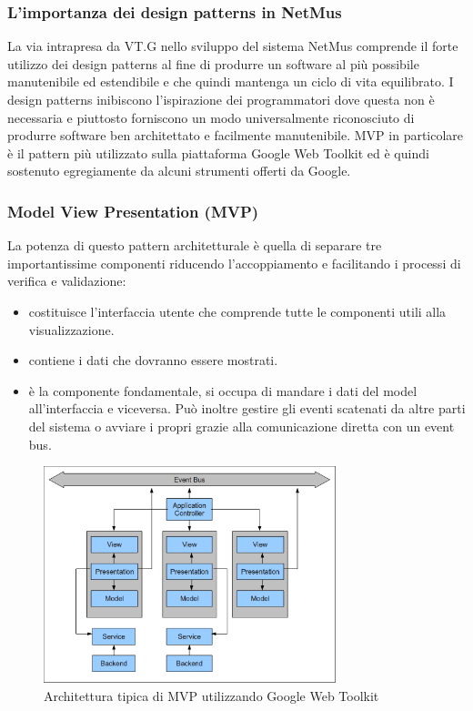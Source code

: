 \subsubsection{L'importanza dei design patterns in NetMus}
La via intrapresa da VT.G nello sviluppo del sistema NetMus comprende il forte
utilizzo dei design patterns al fine di produrre un software al pi\`u
possibile manutenibile ed estendibile e che quindi mantenga un ciclo di
vita equilibrato. 
I design patterns inibiscono l'ispirazione dei programmatori dove
questa non \`e necessaria e piuttosto forniscono un modo universalmente
riconosciuto di produrre software ben architettato e facilmente manutenibile.
MVP in particolare \`e il pattern pi\`u utilizzato sulla piattaforma Google Web
Toolkit ed \`e quindi sostenuto egregiamente da alcuni strumenti offerti da
Google.

\newpage
\subsubsection{Model View Presentation (MVP) }
La potenza di questo pattern architetturale \`e quella di separare tre
importantissime componenti riducendo l'accoppiamento e facilitando i processi di
verifica e validazione:
\begin{itemize}
  \item{ }
  costituisce l'interfaccia utente che comprende tutte le componenti utili alla
  visualizzazione.
  \item{ }
  contiene i dati che dovranno essere mostrati. 
  \item{ }
  \`e la componente fondamentale, si occupa di mandare i dati del model
  all'interfaccia e viceversa. Pu\`o inoltre gestire gli eventi scatenati da
  altre parti del sistema o avviare i propri grazie alla comunicazione diretta
  con un event bus.

\end{itemize}    
\begin{figure}[!h]
\centering
\includegraphics[width=8.5cm]{img/ST/mvp.png}
\caption{Architettura tipica di MVP utilizzando Google Web Toolkit}
\end{figure}

